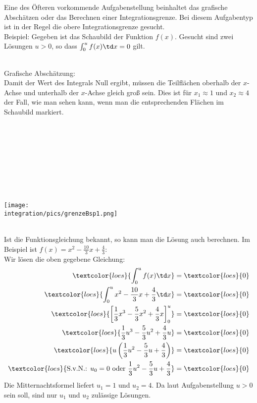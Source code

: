 Eine des Öfteren vorkommende Aufgabenstellung beinhaltet das grafische Abschätzen oder das Berechnen einer Integrationsgrenze. Bei diesem Aufgabentyp ist in der Regel die obere Integrationsgrenze gesucht.\\
Beispiel: Gegeben ist das Schaubild der Funktion \(f(x)\). Gesucht sind zwei Lösungen \(u>0\), so dass \(\int_0^u f(x) \td x=0\) gilt.\\ \\
\begin{minipage}{\textwidth}
	\begin{minipage}{.5\textwidth}\raggedright
		Grafische Abschätzung:\\
		\textcolor{loes}{Damit der Wert des Integrals Null ergibt, müssen die Teilflächen oberhalb der \(x\)-Achse und unterhalb der \(x\)-Achse gleich groß sein. Dies ist für \(x_1\approx 1\) und \(x_2\approx 4\) der Fall, wie man sehen kann, wenn man die entsprechenden Flächen im Schaubild markiert.}\\
		\phantom{text}\\
		\phantom{text}\\
		\phantom{text}\\
		\phantom{text}\\
		\phantom{text}\\
		\phantom{text}\\
		\phantom{text}\\
		\phantom{text}\\
	\end{minipage}
	\begin{minipage}{.5\textwidth}
		\texttt{[image: \\integration/pics/grenzeBsp1.png]}
	\end{minipage}
\end{minipage}\vspace{\baselineskip}\\
Ist die Funktionsgleichung bekannt, so kann man die Lösung auch berechnen. Im Beispiel ist \(f(x)=x^2-\frac{10}{3}x+\frac{4}{3}\):\\
\textcolor{loes}{Wir lösen die oben gegebene Gleichung:}
\begin{align*}
	\textcolor{loes}{\int_0^u f(x) \td x}&=\textcolor{loes}{0}\\
	\textcolor{loes}{\int_0^u x^2-\frac{10}{3}x+\frac{4}{3} \td x}&=\textcolor{loes}{0}\\
	\textcolor{loes}{\left[\frac{1}{3}x^3-\frac{5}{3}x^2+\frac{4}{3}x \right]_0^u}&=\textcolor{loes}{0}\\
	\textcolor{loes}{\frac{1}{3}u^3-\frac{5}{3}u^2+\frac{4}{3}u}&=\textcolor{loes}{0}\\
	\textcolor{loes}{u\left(\frac{1}{3}u^2-\frac{5}{3}u+\frac{4}{3}\right)}&=\textcolor{loes}{0}\\	
	\textcolor{loes}{\text{S.v.N.: }u_0=0\text{ oder }\frac{1}{3}u^2-\frac{5}{3}u+\frac{4}{3}}&=\textcolor{loes}{0}
\end{align*}
\textcolor{loes}{Die Mitternachtsformel liefert \(u_1=1\) und \(u_2=4\). Da laut Aufgabenstellung \(u>0\) sein soll, sind nur \(u_1\) und \(u_2\) zulässige Lösungen.}
\newpage


